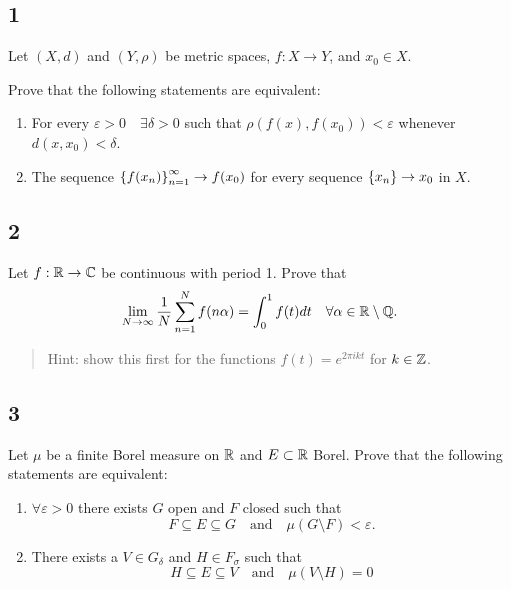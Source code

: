 \hypertarget{section}{%
\subsection{1}\label{section}}

Let \((X, d)\) and \((Y, \rho)\) be metric spaces, \(f: X\to Y\), and
\(x_0 \in X\).

Prove that the following statements are equivalent:

\begin{enumerate}
\def\labelenumi{\arabic{enumi}.}
\tightlist
\item
  For every \(\varepsilon > 0 \quad \exists \delta > 0\) such that
  \(\rho( f(x), f(x_0) ) < \varepsilon\) whenever
  \(d(x, x_0) < \delta\).
\item
  The sequence \(\left\{{f(x_n)}\right\}_{n=1}^\infty \to f(x_0)\) for every
  sequence \(\left\{{x_n}\right\} \to x_0\) in \(X\).
\end{enumerate}

\hypertarget{section-1}{%
\subsection{2}\label{section-1}}

Let \(f: {\mathbb{R}} \to {\mathbb{C}}\) be continuous with period 1. Prove that \[
\lim _{N \rightarrow \infty} \frac{1}{N} \sum_{n=1}^{N} f(n \alpha)=\int_{0}^{1} f(t) d t \quad \forall \alpha \in {\mathbb{R}}\setminus{\mathbb{Q}}.
\]

\begin{quote}
Hint: show this first for the functions \(f(t) = e^{2\pi i k t}\) for
\(k\in {\mathbb{Z}}\).
\end{quote}

\hypertarget{section-2}{%
\subsection{3}\label{section-2}}

Let \(\mu\) be a finite Borel measure on \({\mathbb{R}}\) and \(E \subset {\mathbb{R}}\)
Borel. Prove that the following statements are equivalent:

\begin{enumerate}
\def\labelenumi{\arabic{enumi}.}
\tightlist
\item
  \(\forall \varepsilon > 0\) there exists \(G\) open and \(F\) closed
  such that \[
  F \subseteq E \subseteq G \quad \text{and} \quad \mu(G\setminus F) < \varepsilon.
  \]
\item
  There exists a \(V \in G_\delta\) and \(H \in F_\sigma\) such that \[
  H \subseteq E \subseteq V \quad \text{and}\quad \mu(V\setminus H) = 0
  \]
\end{enumerate}

